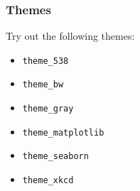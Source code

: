 \documentclass{beamer}
\begin{document}
\begin{frame}
\frametitle{Themes}
\Large
Try out the following themes: 
\smallskip
	\begin{itemize}
		\item	\texttt{theme\_538}
		\item	\texttt{theme\_bw}
		\item	\texttt{theme\_gray}
		\item	\texttt{theme\_matplotlib}
		\item	\texttt{theme\_seaborn}
		\item	\texttt{theme\_xkcd}
	\end{itemize}
	
\end{frame}
\end{document}
